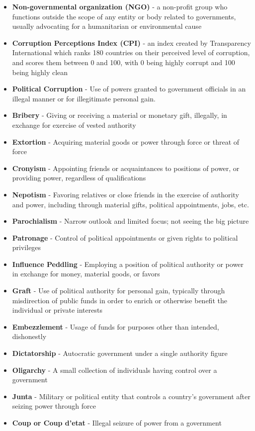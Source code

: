 \documentclass[10pt, letterpaper]{article}
\begin{document}
\begin{itemize}
\item 
\textbf{Non-governmental organization (NGO)} - a non-profit group who functions
outside the scope of any entity or body related to governments, usually
advocating for a humanitarian or environmental cause
\item
\textbf{Corruption Perceptions Index (CPI)} - an index created by Transparency
International which ranks 180 countries on their perceived level of
corruption, and scores them between 0 and 100, with 0 being highly
corrupt and 100 being highly clean
\item
\textbf{Political Corruption} - Use of powers granted to government officials in
an illegal manner or for illegitimate personal gain.
\item
\textbf{Bribery} - Giving or receiving a material or monetary gift, illegally, in
exchange for exercise of vested authority
\item
\textbf{Extortion} - Acquiring material goods or power through force or threat of
force
\item
\textbf{Cronyism} - Appointing friends or acquaintances to positions of power, or
providing power, regardless of qualifications
\item
\textbf{Nepotism} - Favoring relatives or close friends in the exercise of
authority and power, including through material gifts, political
appointments, jobs, etc.
\item
\textbf{Parochialism} - Narrow outlook and limited focus; not seeing the big
picture
\item
\textbf{Patronage} - Control of political appointments or given rights to
political privileges
\item
\textbf{Influence Peddling} - Employing a position of political authority or
power in exchange for money, material goods, or favors
\item
\textbf{Graft} - Use of political authority for personal gain, typically through
misdirection of public funds in order to enrich or otherwise benefit the
individual or private interests
\item
\textbf{Embezzlement} - Usage of funds for purposes other than intended,
dishonestly
\item
\textbf{Dictatorship} - Autocratic government under a single authority figure
\item
\textbf{Oligarchy} - A small collection of individuals having control over a
government
\item
\textbf{Junta} - Military or political entity that controls a country's
government after seizing power through force
\item
\textbf{Coup or Coup d'etat} - Illegal seizure of power from a government
\end{itemize}
\end{document}
